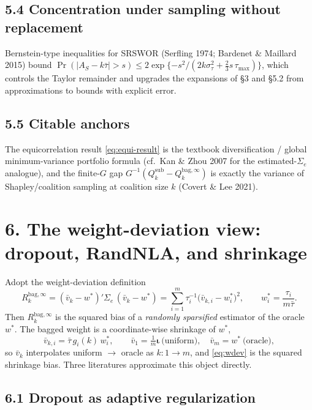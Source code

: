 \documentclass[11pt]{article}
\newcommand{\Sig}{\Sigma_e}
\newcommand{\Qsub}{Q_k^{\mathrm{sub}}}
\newcommand{\Qbag}{Q_k^{\mathrm{bag},\infty}}
\newcommand{\Rk}{R_k^{\mathrm{bag},\infty}}
\newcommand{\iotab}{\bm{\iota}}
\begin{document}
\subsection*{5.4 Concentration under sampling without replacement}

Bernstein-type inequalities for SRSWOR (Serfling 1974; Bardenet \& Maillard 2015) bound
$\Pr(|A_S-k\bar\tau|>s)\le 2\exp\{-s^2/(2k\sigma_\tau^2+\tfrac23 s\,\tau_{\max})\}$,
which controls the Taylor remainder and upgrades the expansions of \S3 and \S5.2 from
approximations to bounds with explicit error.

\subsection*{5.5 Citable anchors}

The equicorrelation result \eqref{eq:equi-result} is the textbook diversification / global
minimum-variance portfolio formula (cf.\ Kan \& Zhou 2007 for the estimated-$\Sig$ analogue),
and the finite-$G$ gap $G^{-1}(\Qsub-\Qbag)$ is exactly the variance of Shapley/coalition
sampling at coalition size $k$ (Covert \& Lee 2021).

\section*{6. The weight-deviation view: dropout, RandNLA, and shrinkage}

Adopt the weight-deviation definition
\begin{equation}\label{eq:wdev}
  \Rk=(\bar v_k-w^*)'\Sig\,(\bar v_k-w^*)=\sum_{i=1}^m\tau_i^{-1}\big(\bar v_{k,i}-w_i^*\big)^2,
  \qquad w_i^*=\frac{\tau_i}{m\bar\tau}.
\end{equation}
Then $\Rk$ is the squared bias of a \emph{randomly sparsified} estimator of the oracle
$w^*$. The bagged weight is a coordinate-wise shrinkage of $w^*$,
\begin{equation}\label{eq:shrink}
  \bar v_{k,i}=\bar\tau\,g_i(k)\,w_i^*,
  \qquad \bar v_{1}=\tfrac1m\iotab\ \text{(uniform)},\quad \bar v_{m}=w^*\ \text{(oracle)},
\end{equation}
so $\bar v_k$ interpolates uniform $\to$ oracle as $k:1\to m$, and \eqref{eq:wdev} is the
squared shrinkage bias. Three literatures approximate this object directly.

\subsection*{6.1 Dropout as adaptive regularization}
\end{document}
